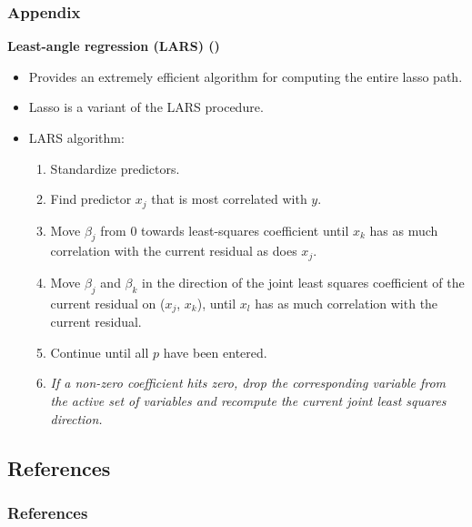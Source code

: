 \begin{frame}[fragile]
    \frametitle{Appendix}
    \textbf{Least-angle regression (LARS) (\cite{efron2003lars})} \\
    \begin{itemize}
        \item Provides an extremely efficient algorithm for computing the entire lasso path.
        \item Lasso is a variant of the LARS procedure.
        \item LARS algorithm:
        \begin{enumerate}
            \item Standardize predictors.
            \item Find predictor $x_j$ that is most correlated with $y$.
            \item Move $\beta_j$ from 0 towards least-squares coefficient until  $x_k$ has as much correlation with the current residual as does $x_j$.
            \item Move $\beta_j$ and $\beta_k$ in the direction of the joint least squares coefficient of the current residual on ($x_j$, $x_k$), until $x_l$ has as much correlation with the current residual.
            \item Continue until all $p$ have been entered.
            \item \textit{If a non-zero coefficient hits zero, drop the corresponding variable from the active set of variables and recompute the current joint least squares direction.}
        \end{enumerate}
    \end{itemize}
\end{frame}
\subsection{References}
\begin{frame}[allowframebreaks]
    \frametitle{References}
    \nocite{*}
    \printbibliography[heading=none]%
\end{frame}
